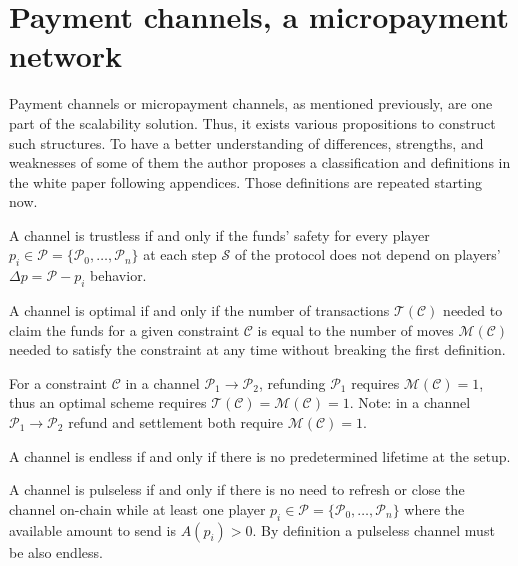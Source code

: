 \chapter{Payment channels, a micropayment network}
\label{chap:paymentChannels}

Payment channels or micropayment channels, as mentioned previously, are one part
of the scalability solution. Thus, it exists various propositions to construct
such structures. To have a better understanding of differences, strengths, and
weaknesses of some of them the author proposes a classification and definitions
in the white paper following appendices. Those definitions are repeated starting
now.

\begin{definition}[Trustless]
  A channel is trustless if and only if the funds' safety for every player
  $p_i \in \mathcal{P} = \{\mathcal{P}_0, \dots, \mathcal{P}_n\}$
  at each step $\mathcal{S}$ of the protocol does not depend on
  players' $\Delta p = \mathcal{P} - p_i$ behavior.
\end{definition}

\begin{definition}[Optimal]
  A channel is optimal if and only if the number of transactions $\mathcal{T}(\mathcal{C})$
  needed to claim the funds for a given constraint $\mathcal{C}$ is equal to
  the number of moves $\mathcal{M}(\mathcal{C})$ needed to satisfy the constraint
  at any time without breaking the first definition.

  For a constraint $\mathcal{C}$ in a channel $\mathcal{P}_1 \rightarrow \mathcal{P}_2$,
  refunding $\mathcal{P}_1$ requires $\mathcal{M}(\mathcal{C}) = 1$, thus
  an optimal scheme requires $\mathcal{T}(\mathcal{C}) = \mathcal{M}(\mathcal{C}) = 1$.
  Note: in a channel $\mathcal{P}_1 \rightarrow \mathcal{P}_2$ refund and settlement both
  require $\mathcal{M}(\mathcal{C}) = 1$.
\end{definition}

\begin{definition}[Endless]
  A channel is endless if and only if there is no predetermined lifetime at the setup.
\end{definition}

\begin{definition}[Pulseless]
  A channel is pulseless if and only if there is no need to refresh or close the
  channel on-chain while at least one player $p_i \in \mathcal{P} = \{\mathcal{P}_0,
  \dots, \mathcal{P}_n\}$ where the available amount to send is $A(p_i) > 0$. By
  definition a pulseless channel must be also endless.
\end{definition}

